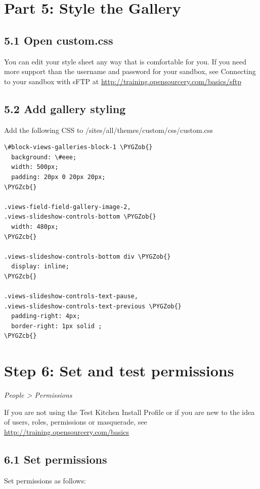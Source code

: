 \documentclass[letterpaper,10pt,english]{sphinxmanual}
\def\PYGZob{\char`\{}
\def\PYGZcb{\char`\}}
\begin{document}
\section{Part 5: Style the Gallery}
\label{recipe:part-5-style-the-gallery}

\subsection{5.1 Open custom.css}
\label{recipe:open-custom-css}
You can edit your style sheet any way that is comfortable for you. If you need more support than the username and password for your sandbox, see Connecting to your sandbox with sFTP at \href{http://training.opensourcery.com/basics/sftp}{http://training.opensourcery.com/basics/sftp}


\subsection{5.2 Add gallery styling}
\label{recipe:add-gallery-styling}
Add the following CSS to /sites/all/themes/custom/css/custom.css

\begin{Verbatim}[commandchars=\\\{\}]
\#block-views-galleries-block-1 \PYGZob{}
  background: \#eee;
  width: 500px;
  padding: 20px 0 20px 20px;
\PYGZcb{}

.views-field-field-gallery-image-2,
.views-slideshow-controls-bottom \PYGZob{}
  width: 480px;
\PYGZcb{}

.views-slideshow-controls-bottom div \PYGZob{}
  display: inline;
\PYGZcb{}

.views-slideshow-controls-text-pause,
.views-slideshow-controls-text-previous \PYGZob{}
  padding-right: 4px;
  border-right: 1px solid ;
\PYGZcb{}
\end{Verbatim}


\section{Step 6: Set and test permissions}
\label{recipe:step-6-set-and-test-permissions}
\emph{People \textgreater{} Permissions}

If you are not using the Test Kitchen Install Profile or if you are new to the idea of users, roles, permissions or masquerade, see \href{http://training.opensourcery.com/basics}{http://training.opensourcery.com/basics}


\subsection{6.1 Set permissions}
\label{recipe:set-permissions}
Set permissions as follows:
\end{document}
